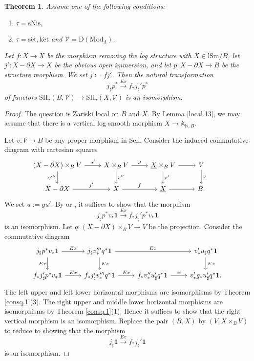 \documentclass[10pt]{amsart}
\newtheorem{thm}{Theorem}[subsection]
\theoremstyle{definition}
\theoremstyle{remark}
\numberwithin{equation}{subsection}
\newcommand{\A}{\mathbb{A}}
\newcommand{\N}{\mathbb{N}}
\newcommand{\cV}{\mathcal{V}}
\newcommand{\ul}{\underline}
\newcommand{\SH}{\mathrm{SH}}
\newcommand{\DLambda}{\mathrm{D}(\mathrm{Mod}_{\Lambda})}
\newcommand{\Sch}{\mathrm{Sch}}
\newcommand{\lSm}{\mathrm{lSm}}
\newcommand{\unit}{\mathbf{1}}
\newcommand{\sNis}{\mathrm{sNis}}
\newcommand{\ketale}{\mathrm{k\acute{e}t}}
\newcommand{\setale}{\mathrm{s\acute{e}t}}
\begin{document}
\begin{thm}
\label{local.6}
Assume one of the following conditions:
\begin{enumerate}
\item[\textup{(i)}]
$\tau=\sNis$,
\item[\textup{(ii)}]
$\tau=\setale,\ketale$ and $\cV=\DLambda$.
\end{enumerate}
Let $f\colon X\to \ul{X}$ be the morphism removing the log structure with $X\in \lSm/B$, let $j'\colon X-\partial X\to X$ be the obvious open immersion, and let $p\colon X-\partial X\to B$ be the structure morphism.
We set $j:=fj'$.
Then the natural transformation
\[
j_\sharp p^* \xrightarrow{Ex} f_*j_\sharp' p^*
\]
of functors $\SH_{\tau}(B,\cV)\to \SH_{\tau}(X,\cV)$ is an isomorphism.
\end{thm}
\begin{proof}
The question is Zariski local on $B$ and $X$.
By Lemma \ref{local.13}, we may assume that there is a vertical log smooth morphism $X\to \A_{\N,B}$.

Let $v\colon V\to B$ be any proper morphism in $\Sch$.
Consider the induced commutative diagram with cartesian squares
\[
\begin{tikzcd}
(X-\partial X)\times_B V\ar[d,"v'''"']\ar[r,"u'"]&
X\times_B V\ar[d,"v''"]\ar[r,"g"]&
\ul{X}\times_B V\ar[d,"v'"]\ar[r]&
V\ar[d,"v"]&
\\
X-\partial X\ar[r,"j'"]&
X\ar[r,"f"]&
\ul{X}\ar[r]&
B.
\end{tikzcd}
\]
We set $u:=gu'$.
By \cite[Lemma 2.2.23]{Ayo071} or \cite[Proposition 4.2.13]{CD19}, it suffices to show that the morphism
\[
j_\sharp  p^* v_*\unit \xrightarrow{Ex} f_*j_\sharp' p^* v_* \unit
\]
is an isomorphism.
Let $q\colon (X-\partial X)\times_B V\to V$ be the projection.
Consider the commutative diagram
\[
\begin{tikzcd}
j_\sharp p^* v_*\unit\ar[d,"Ex"']\ar[r,"Ex"]&
j_\sharp v_*''' q^*\unit\ar[d,"Ex"]\ar[rr,"Ex"]&
&
v_*'u_\sharp q^*\unit\ar[d,"Ex"]
\\
f_*j_\sharp'p^* v_*\unit\ar[r,"Ex"]&
f_*j_\sharp'v_*''' q^*\unit\ar[r,"Ex"]&
f_*v_*''u_\sharp'q^*\unit\ar[r,"\simeq"]&
v_*'g_* u_\sharp'q^*\unit.
\end{tikzcd}
\]
The left upper and left lower horizontal morphisms are isomorphisms by Theorem \ref{consq.1}(3).
The right upper and middle lower horizontal morphisms are isomorphisms by Theorem \ref{consq.1}(1).
Hence it suffices to show that the right vertical morphism is an isomorphism.
Replace the pair $(B,X)$ by $(V,X\times_B V)$ to reduce to showing that the morphism
\[
j_\sharp \unit \xrightarrow{Ex} f_*j_\sharp' \unit
\]
is an isomorphism.


\end{proof}
\end{document}
